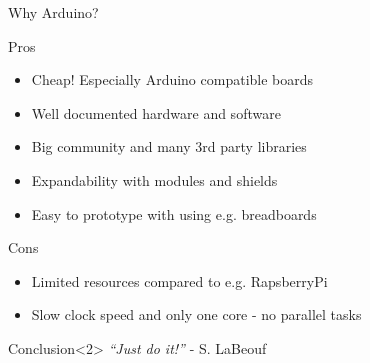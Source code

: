 \begin{frame}{Why Arduino?}
	\begin{block}{Pros}
		\begin{itemize}
			\item Cheap! Especially \textcolor{ReneOrange}{Arduino compatible} boards
			\item Well documented hardware and software
			\item Big community and many \textcolor{ReneOrange}{3rd party libraries}
			\item Expandability with \textcolor{ReneOrange}{modules} and shields
			\item Easy to \textcolor{ReneOrange}{prototype} with using e.g. breadboards
		\end{itemize}		
	\end{block}	
	\begin{block}{Cons}
		\begin{itemize}
			\item Limited resources compared to e.g. RapsberryPi
			\item Slow clock speed and only one core - \textcolor{ReneOrange}{no parallel tasks}
		\end{itemize}	
	\end{block}
	\begin{exampleblock}{Conclusion}<2>
		\emph{``Just do it!''} - S. LaBeouf
	\end{exampleblock}		
\end{frame}

